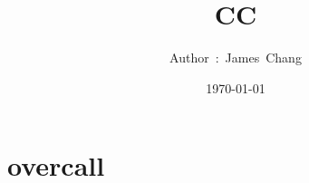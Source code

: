 

\title{CC}
\author{ {\Biohazard} \hspace{1.5mm} \hspace{1.5mm} Author\ :\ James\ Chang}
\date{\today}


\large

\tableofcontents

\chapter{overcall}






